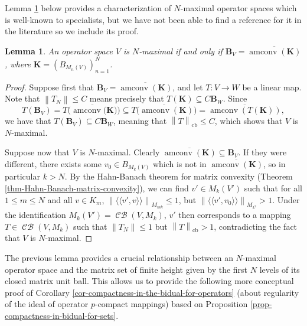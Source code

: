 \documentclass[11pt]{amsart}
\DeclareMathOperator{\cb}{cb}
\DeclareMathOperator{\CB}{\mathcal{CB}}
\DeclareMathOperator{\amconv}{amconv}
\newcommand{\n}[1]{ \left\|#1\right\| }
\newcommand{\mpair}[2]{{\langle\langle #1, #2 \rangle\rangle}}
\newtheorem{lemma}[theorem]{Lemma}
\numberwithin{equation}{section}
\begin{document}
Lemma \ref{lemma-N-maximal-amconv} below provides a characterization of $N$-maximal operator spaces which is well-known to specialists, but we have not been able to find a reference for it in the literature so we include its proof.

\begin{lemma}\label{lemma-N-maximal-amconv}
An operator space $V$ is $N$-maximal if and only if $\mathbf{B}_V = \overline{\amconv (\mathbf{K})}$, where $\mathbf{K} = (B_{M_n(V)})_{n=1}^N$.
\end{lemma}

\begin{proof}
Suppose first that $\mathbf{B}_V = \overline{\amconv(\mathbf{K})}$, and let $T : V \to W$ be a linear map. Note that $\n{T_N} \le C$ means precisely that $T(\mathbf{K}) \subseteq C \mathbf{B}_W$. Since
\begin{equation}\label{eqn-lemma-N-maximal-amconv}
T(\mathbf{B}_V) = T \Big( \overline{\amconv(\mathbf{K}})  \Big) \subseteq \overline{ T\big( \amconv(\mathbf{K})\big) } = \overline{ \amconv(T(\mathbf{K}))},
\end{equation}
we have that $T(\mathbf{B}_V) \subseteq C \mathbf{B}_W$, meaning that $\n{T}_{\cb} \le C$, which shows that $V$ is $N$-maximal. 

Suppose now that $V$ is $N$-maximal. Clearly $\overline{\amconv (\mathbf{K})} \subseteq \mathbf{B}_V$. If they were different, there exists some $v_0 \in B_{M_k(V)}$ which is not in $\overline{\amconv (\mathbf{K})} $, so in particular $k > N$.
By the Hahn-Banach theorem for matrix convexity (Theorem \ref{thm-Hahn-Banach-matrix-convexity}), we can find $v' \in M_k(V')$ such that for all $1 \le m\le N$ and all $v \in K_m$,
$\n{ \mpair{v'}{v} }_{M_{mk}} \le 1$, but $\n{ \mpair{v'}{v_0} }_{M_{k^2}} > 1$.
Under the identification $M_k(V') = \CB(V,M_k)$, $v'$ then corresponds to a mapping $T \in\CB(V,M_k)$ such that $\n{T_N} \le 1$ but $\n{T}_{\cb}>1$, contradicting the fact that $V$ is $N$-maximal.
\end{proof}

The previous lemma provides a crucial relationship between an $N$-maximal operator space and the matrix set of finite height given by the first $N$ levels of its closed matrix unit ball. This allows us to provide the following  more conceptual proof of Corollary \ref{cor-compactness-in-the-bidual-for-operators} (about regularity of the ideal of operator $p$-compact mappings) based on Proposition \ref{prop-compactness-in-bidual-for-sets}.
\end{document}
